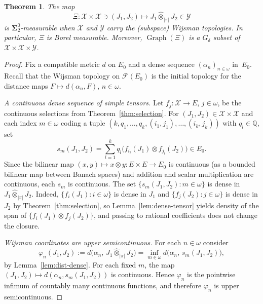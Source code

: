 \documentclass[12pt]{amsart}
\theoremstyle{plain}
\newtheorem{theorem}{Theorem}[section]
\theoremstyle{definition}
\theoremstyle{remark}
\DeclareMathOperator{\Graph}{Graph}
\newcommand{\bbQ}{\mathbb{Q}}
\begin{document}
\begin{theorem}\label{thm:tensor}
The map
\[
    \Xi \colon \mathscr{X} \times \mathscr{X} \ni (J_1, J_2)
    \longmapsto J_1 \hat{\otimes}_{|\pi|} J_2 \in \mathscr{Y}
\]
is $\boldsymbol{\Sigma}^0_2$-measurable when $\mathscr{X}$ and $\mathscr{Y}$
carry the (subspace) Wijsman topologies.  In particular, $\Xi$ is Borel
measurable.  Moreover, $\Graph(\Xi)$ is a $G_\delta$ subset of
$\mathscr{X} \times \mathscr{X} \times \mathscr{Y}$.
\end{theorem}

\begin{proof}
Fix a compatible metric $d$ on $E_0$ and a dense sequence
$(\alpha_n)_{n \in \omega}$ in~$E_0$.  Recall that the Wijsman topology on
$\mathcal{F}(E_0)$ is the initial topology for the distance maps
$F \mapsto d(\alpha_n, F)$, $n \in \omega$.

\medskip
\emph{A continuous dense sequence of simple tensors.}
Let $f_j \colon \mathscr{X} \to E$, $j \in \omega$, be the continuous selections
from Theorem~\ref{thm:selection}.  For
$(J_1, J_2) \in \mathscr{X} \times \mathscr{X}$ and each index $m \in \omega$
coding a tuple $(k, q_1, \ldots, q_k, (i_1, j_1), \ldots, (i_k, j_k))$ with
$q_l \in \bbQ$, set
\[
    s_m(J_1, J_2)
    = \sum_{l=1}^k q_l \bigl(f_{i_l}(J_1) \otimes f_{j_l}(J_2)\bigr) \in E_0.
\]
Since the bilinear map $(x, y) \mapsto x \otimes y \colon E \times E \to E_0$ is
continuous (as a bounded bilinear map between Banach spaces) and addition and
scalar multiplication are continuous, each $s_m$ is continuous.  The set
$\{s_m(J_1, J_2) \colon m \in \omega\}$ is dense in
$J_1 \hat{\otimes}_{|\pi|} J_2$.  Indeed,
$\{f_i(J_1) \colon i \in \omega\}$ is dense in $J_1$ and
$\{f_j(J_2) \colon j \in \omega\}$ is dense in $J_2$ by
Theorem~\ref{thm:selection}, so Lemma~\ref{lem:dense-tensor} yields density of
the span of $\{f_i(J_1) \otimes f_j(J_2)\}$, and passing to rational
coefficients does not change the closure.

\medskip
\emph{Wijsman coordinates are upper semicontinuous.}
For each $n \in \omega$ consider
\[
    \varphi_n(J_1, J_2)
    := d\bigl(\alpha_n,\, J_1 \hat{\otimes}_{|\pi|} J_2\bigr)
    = \inf_{m \in \omega} d\bigl(\alpha_n,\, s_m(J_1, J_2)\bigr),
\]
by Lemma~\ref{lem:dist-dense}.  For each fixed $m$, the map
$(J_1, J_2) \mapsto d(\alpha_n, s_m(J_1, J_2))$ is continuous.  Hence $\varphi_n$
is the pointwise infimum of countably many continuous functions, and therefore
$\varphi_n$ is upper semicontinuous.


\end{proof}
\end{document}
